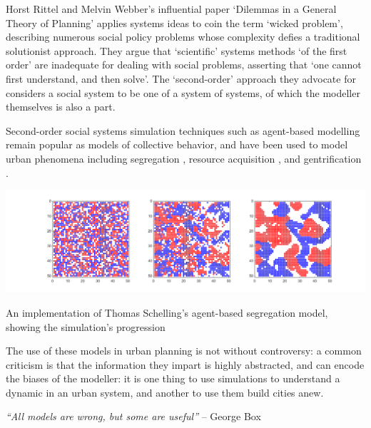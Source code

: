 \documentclass[nofonts,nols,justified,nobib]{tufte-book}
\begin{document}
Horst Rittel and Melvin Webber's influential paper `Dilemmas in a General Theory of Planning' \cite{rittel_dilemmas_1973} applies systems ideas to coin the term `wicked problem', describing numerous social policy problems whose complexity defies a traditional solutionist approach. They argue that `scientific' systems methods `of the first order' are inadequate for dealing with social problems, asserting that `one cannot first understand, and then solve'. The `second-order' approach they advocate for considers a social system to be one of a system of systems, of which the modeller themselves is also a part.

Second-order social systems simulation techniques such as agent-based modelling remain popular as models of collective behavior, and have been used to model urban phenomena including segregation \cite{schelling_dynamic_1971}, resource acquisition \cite{epstein_growing_1996-1}, and gentrification \cite{batty_new_2013}.
\begin{marginfigure}
\includegraphics[width=\textwidth]{img/1/schelling-segregation.png}
\caption{An implementation of Thomas Schelling's agent-based segregation model, showing the simulation's progression \cite{schelling_dynamic_1971}  \label{b}}
\end{marginfigure}
The use of these models in urban planning is not without controversy: a common criticism is that the information they impart is highly abstracted, and can encode the biases of the modeller: it is one thing to use simulations to understand a dynamic in an urban system, and another to use them build cities anew.

\begin{flushright}
\emph{``All models are wrong, but some are useful''}
-- George Box
\end{flushright}

\end{document}
